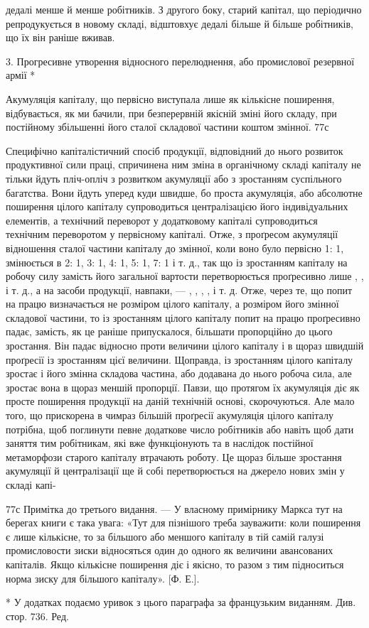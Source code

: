 дедалі менше й менше робітників. З другого боку, старий капітал,
що періодично репродукується в новому складі, відштовхує
дедалі більше й більше робітників, що їх він раніше вживав.

3. Прогресивне утворення відносного перелюднення,
або промислової резервної армії *

Акумуляція капіталу, що первісно виступала лише як кількісне
поширення, відбувається, як ми бачили, при безперервній
якісній зміні його складу, при постійному збільшенні його сталої
складової частини коштом змінної. 77с

Специфічно капіталістичний спосіб продукції, відповідний
до нього розвиток продуктивної сили праці, спричинена ним
зміна в органічному складі капіталу не тільки йдуть пліч-опліч
з розвитком акумуляції або з зростанням суспільного багатства.
Вони йдуть уперед куди швидше, бо проста акумуляція,
або абсолютне поширення цілого капіталу супроводиться централізацією
його індивідуальних елементів, а технічний переворот
у додатковому капіталі супроводиться технічним переворотом
у первісному капіталі. Отже, з проґресом акумуляції
відношення сталої частини капіталу до змінної, коли воно було
первісно 1: 1, змінюється в 2: 1, 3: 1, 4: 1, 5: 1, 7: 1 і т. д.,
так що із зростанням капіталу на робочу силу замість  його
загальної вартости перетворюється проґресивно лише , ,
   і т. д., а на засоби продукції, навпаки, — , , ,
,  і т. д. Отже, через те, що попит на працю визначається не
розміром цілого капіталу, а розміром його змінної складової
частини, то із зростанням цілого капіталу попит на працю проґресивно
падає, замість, як це раніше припускалося, більшати
пропорційно до цього зростання. Він падає відносно проти величини
цілого капіталу і в щораз швидшій проґресії із зростанням
цієї величини. Щоправда, із зростанням цілого капіталу зростає
і його змінна складова частина, або додавана до нього робоча
сила, але зростає вона в щораз меншій пропорції. Павзи, що протягом
їх акумуляція діє як просте поширення продукції на
даній технічній основі, скорочуються. Але мало того, що прискорена
в чимраз більшій проґресії акумуляція цілого капіталу
потрібна, щоб поглинути певне додаткове число робітників або
навіть щоб дати заняття тим робітникам, які вже функціонують
та в наслідок постійної метаморфози старого капіталу втрачають
роботу. Це щораз більше зростання акумуляції й централізації
ще й собі перетворюється на джерело нових змін у складі капі-

77с Примітка до третього видання. — У власному примірнику Маркса
тут на берегах книги є така увага: «Тут для пізнішого треба зауважити:
коли поширення є лише кількісне, то за більшого або меншого капіталу
в тій самій галузі промисловости зиски відносяться один до одного як
величини авансованих капіталів. Якщо кількісне поширення діє і якісно,
то разом з тим підноситься норма зиску для більшого капіталу». [Ф. Е.].

* У додатках подаємо уривок з цього параграфа за французьким
виданням. Див. стор. 736. Ред.
